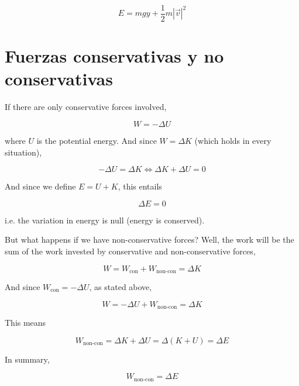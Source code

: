 \documentclass[12pt]{article}
\theoremstyle{definition}
\begin{document}
\begin{equation}
    E = mgy + \frac{1}{2}m \left| \vec{v} \right|^2
\end{equation}

\section{Fuerzas conservativas y no conservativas}

If there are only conservative forces involved, 

\begin{equation*}
    W = - \Delta U
\end{equation*}

where $U$ is the potential energy. And since $W = \Delta K$ (which holds in
every situation),

\begin{equation*}
    - \Delta U = \Delta K \iff \Delta K + \Delta U = 0
\end{equation*}

And since we define $E = U + K$, this entails 

\begin{equation*}
    \Delta E = 0
\end{equation*}

i.e. the variation in energy is null (energy is conserved).


But what happens if we have non-conservative forces? Well, the work will be the
sum of the work invested by conservative and non-conservative forces, 

\begin{equation*}
    W = W_{\text{con}} + W_{\text{non-con}} = \Delta K
\end{equation*}

And since $W_{\text{con}} = -\Delta U$, as stated above, 

\begin{equation*}
    W = -\Delta U + W_{\text{non-con}} = \Delta K
\end{equation*}

This means 

\begin{equation*}
    W_{\text{non-con}} = \Delta K + \Delta U = \Delta(K + U) = \Delta E
\end{equation*}

In summary, 

\begin{equation}
    W_{\text{non-con}} = \Delta E
\end{equation}
\end{document}
